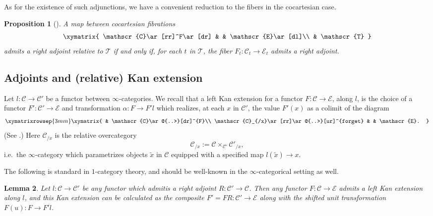 \documentclass[reqno]{amsart}
\newtheorem{lemma}{Lemma}[section]
\newtheorem{proposition}[lemma]{Proposition}
\theoremstyle{definition}
\newcommand{\msc}[1]{\mathscr{#1}}
\renewcommand{\1}{\mathbf{1}}
\begin{document}
As for the existence of such adjunctions, we have a convenient reduction to the fibers in the cocartesian case.

\begin{proposition}[{\cite[Proposition 7.3.2.6]{ha}}]\label{prop:reladj_exists}
A map between cocartesian fibrations
\[
\xymatrix{
\msc{C}\ar[rr]^F\ar[dr] & & \msc{E}\ar[dl]\\
	& \msc{T}
}
\]
admits a right adjoint relative to $\msc{T}$ if and only if, for each $t$ in $\msc{T}$, the fiber $F_t:\msc{C}_t\to \msc{E}_t$ admits a right adjoint.
\end{proposition}


\subsection{Adjoints and (relative) Kan extension}

Let $l:\msc{C}\to \msc{C}'$ be a functor between $\infty$-categories.  We recall that a left Kan extension for a functor $F:\msc{C}\to \msc{E}$, along $l$, is the choice of a functor $F':\msc{C}'\to \msc{E}$ and transformation $\alpha:F\to F'l$ which realizes, at each $x$ in $\msc{C}'$, the value $F'(x)$ as a colimit of the diagram
\[
\xymatrixrowsep{3mm}
\xymatrix{
	& \msc{C}\ar@{..>}[dr]^{F}\\
\msc{C}_{/x}\ar[rr]\ar@{..>}[ur]^{forget} & & \msc{E}.
}
\]
(See \cite[\href{https://kerodon.net/tag/02Y7}{02Y7}]{kerodon}.)  Here $\msc{C}_{/x}$ is the relative overcategory
\[
\msc{C}_{/x}:=\msc{C}\times_{\msc{C}'}\msc{C}'_{/x},
\]
i.e.\ the $\infty$-category which parametrizes objects $\tilde{x}$ in $\msc{C}$ equipped with a specified map $l(\tilde{x})\to x$.

The following is standard in $1$-category theory, and should be well-known in the $\infty$-categorical setting as well.

\begin{lemma}\label{lem:2916}
Let $l:\msc{C}\to \msc{C}'$ be any functor which admitis a right adjoint $R:\msc{C}'\to \msc{C}$. Then any functor $F:\msc{C}\to \msc{E}$ admits a left Kan extension along $l$, and this Kan extension can be calculated as the composite $F'=FR:\msc{C}'\to \msc{E}$ along with the shifted unit transformation $F(u):F\to F'l$.
\end{lemma}
\end{document}
